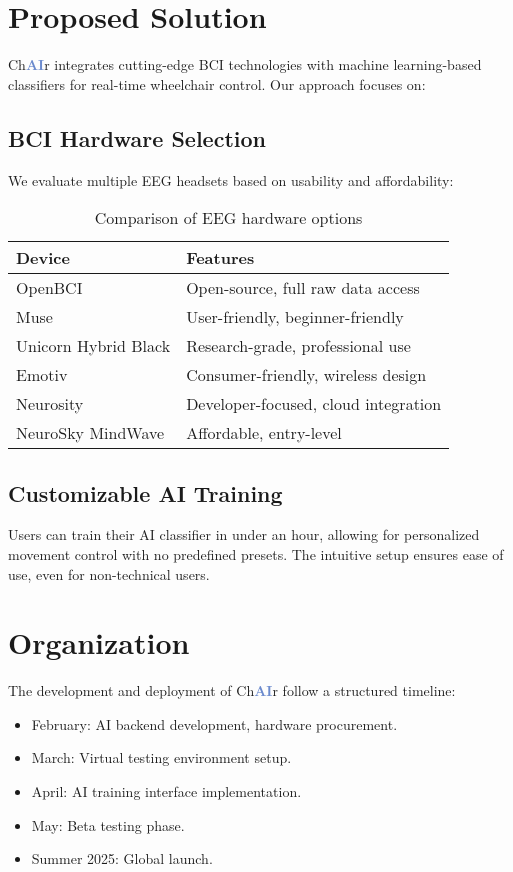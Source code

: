 \documentclass[a4paper]{article}
\makeatletter
\newcommand\chair{%
  Ch\textcolor[HTML]{6B8ACD}{\textbf{AI}}r
  \@}
\makeatother
\begin{document}
\section{Proposed Solution}

\chair integrates cutting-edge BCI technologies with machine learning-based classifiers for real-time wheelchair control. Our approach focuses on:

\subsection{BCI Hardware Selection}
We evaluate multiple EEG headsets based on usability and affordability:
\begin{table}[h]
    \centering
    \begin{tabular}{ll}
    \toprule
    Device & Features \\
    \midrule
    OpenBCI & Open-source, full raw data access \\
    Muse & User-friendly, beginner-friendly \\
    Unicorn Hybrid Black & Research-grade, professional use \\
    Emotiv & Consumer-friendly, wireless design \\
    Neurosity & Developer-focused, cloud integration \\
    NeuroSky MindWave & Affordable, entry-level \\
    \bottomrule
    \end{tabular}
    \caption{Comparison of EEG hardware options}
\end{table}

\subsection{Customizable AI Training}
Users can train their AI classifier in under an hour, allowing for personalized movement control with no predefined presets. The intuitive setup ensures ease of use, even for non-technical users.

\section{Organization}

The development and deployment of \chair follow a structured timeline:
\begin{itemize}
    \item February: AI backend development, hardware procurement.
    \item March: Virtual testing environment setup.
    \item April: AI training interface implementation.
    \item May: Beta testing phase.
    \item Summer 2025: Global launch.
\end{itemize}
\end{document}
